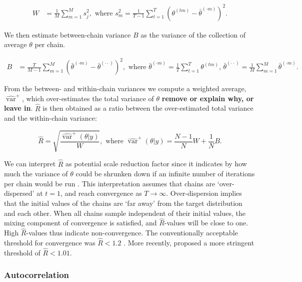 \documentclass[Royal,times,sageh]{sagej}
\begin{document}
\begin{align*}
W&=\frac{1}{M} \sum_{m=1}^{M} s_{j}^{2}, \text { where } s_{m}^{2}=\frac{1}{T-1} \sum_{t=1}^{T}\left(\theta^{(t m)}-\bar{\theta}^{(\cdot m)}\right)^{2}. 
\end{align*}

We then estimate between-chain variance \(B\) as the variance of the
collection of average \(\theta\) per chain.

\begin{align*}
B&=\frac{T}{M-1} \sum_{m=1}^{M}\left(\bar{\theta}^{(\cdot m)}-\bar{\theta}^{(\cdot \cdot)}\right)^{2}, \text { where } \bar{\theta}^{(\cdot m)}=\frac{1}{T} \sum_{t=1}^{T} \theta^{(t m)} \text{, } \bar{\theta}^{(\cdot \cdot)}=\frac{1}{M} \sum_{m=1}^{M} \bar{\theta}^{(\cdot m)}. 
\end{align*}

From the between- and within-chain variances we compute a weighted
average, \(\widehat{\operatorname{var}}^{+}\), which over-estimates the
total variance of \(\theta\) \textbf{remove or explain why, or leave
in}. \(\widehat{R}\) is then obtained as a ratio between the
over-estimated total variance and the within-chain variance:

\begin{equation*}
\widehat{R}=\sqrt{\frac{\widehat{\operatorname{var}}^{+}(\theta | y)}{W}},
\text{ where } \widehat{\operatorname{var}}^{+}(\theta | y)=\frac{N-1}{N} W+\frac{1}{N} B.
\end{equation*}

We can interpret \(\widehat{R}\) as potential scale reduction factor
since it indicates by how much the variance of \(\theta\) could be
shrunken down if an infinite number of iterations per chain would be run
\citep{gelm92}. This interpretation assumes that chains are
`over-dispersed' at \(t=1\), and reach convergence as \(T \to \infty\).
Over-dispersion implies that the initial values of the chains are `far
away' from the target distribution and each other. When all chains
sample independent of their initial values, the mixing component of
convergence is satisfied, and \(\widehat{R}\)-values will be close to
one. High \(\widehat{R}\)-values thus indicate non-convergence. The
conventionally acceptable threshold for convergence was
\(\widehat{R} < 1.2\) \citep{gelm92}. More recently, \citet{veht19}
proposed a more stringent threshold of \(\widehat{R} < 1.01\).

\hypertarget{autocorrelation}{%
\subsubsection{Autocorrelation}\label{autocorrelation}}
\end{document}
